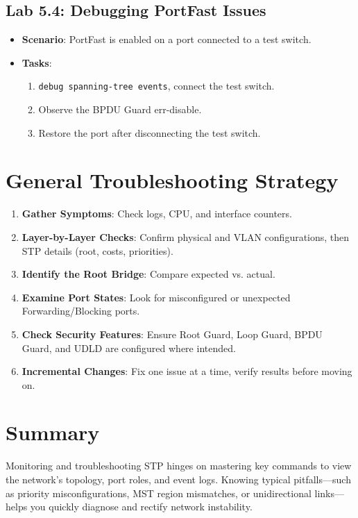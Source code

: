 \documentclass[a4paper]{report}
\begin{document}
\subsection*{Lab 5.4: Debugging PortFast Issues}
\begin{itemize}
    \item \textbf{Scenario}: PortFast is enabled on a port connected to a test switch.
    \item \textbf{Tasks}:
    \begin{enumerate}
        \item \texttt{debug spanning-tree events}, connect the test switch.
        \item Observe the BPDU Guard err-disable.
        \item Restore the port after disconnecting the test switch.
    \end{enumerate}
\end{itemize}

\section{General Troubleshooting Strategy}
\begin{enumerate}
    \item \textbf{Gather Symptoms}: Check logs, CPU, and interface counters.
    \item \textbf{Layer-by-Layer Checks}: Confirm physical and VLAN configurations, then STP details (root, costs, priorities).
    \item \textbf{Identify the Root Bridge}: Compare expected vs. actual.
    \item \textbf{Examine Port States}: Look for misconfigured or unexpected Forwarding/Blocking ports.
    \item \textbf{Check Security Features}: Ensure Root Guard, Loop Guard, BPDU Guard, and UDLD are configured where intended.
    \item \textbf{Incremental Changes}: Fix one issue at a time, verify results before moving on.
\end{enumerate}

\section{Summary}
Monitoring and troubleshooting STP hinges on mastering key commands to view the network’s topology, port roles, and event logs. Knowing typical pitfalls—such as priority misconfigurations, MST region mismatches, or unidirectional links—helps you quickly diagnose and rectify network instability.
\end{document}
